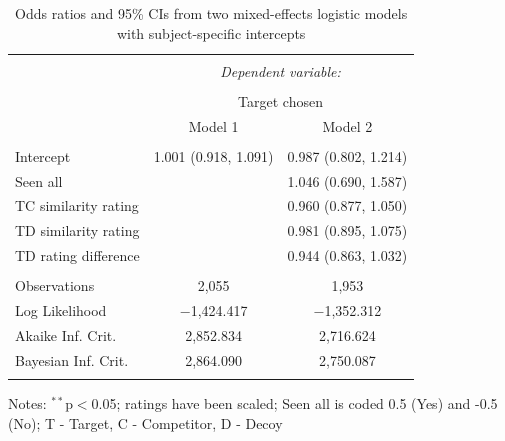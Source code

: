 \documentclass[12pt, a4paper]{article}
\newcommand{\AT}[1] {{\textcolor{cyan}{#1}}}
\newcommand{\TM}[1] {{\textcolor{orange}{#1}}}
\begin{document}
\begin{table}[htb]
\centering
  \begin{threeparttable}
    \captionsetup{justification=centering}
    \caption{Odds ratios and 95\% CIs from two mixed-effects logistic models with subject-specific intercepts}
  \label{latentattr_exp2reg}
\begin{tabular}{@{\extracolsep{5pt}}lcc}
\\[-1.8ex]\hline
\hline \\[-1.8ex]
 & \multicolumn{2}{c}{\textit{Dependent variable:}} \\
\cline{2-3}
\\[-1.8ex] & \multicolumn{2}{c}{Target chosen} \\
 & Model 1 & Model 2 \\
\hline \\[-1.8ex]
 Intercept & 1.001 (0.918, 1.091) & 0.987 (0.802, 1.214) \\
  Seen all &  & 1.046 (0.690, 1.587) \\
  TC similarity rating &  & 0.960 (0.877, 1.050) \\
  TD similarity rating &  & 0.981 (0.895, 1.075) \\
  TD rating difference &  & 0.944 (0.863, 1.032) \\
 \hline \\[-1.8ex]
Observations & 2,055 & 1,953 \\
Log Likelihood & $-$1,424.417 & $-$1,352.312 \\
Akaike Inf. Crit. & 2,852.834 & 2,716.624 \\
Bayesian Inf. Crit. & 2,864.090 & 2,750.087 \\
\hline
\hline \\[-1.8ex]
\end{tabular}
    \begin{tablenotes}
      \small
      \item Notes: $^{**}$p$<$0.05; ratings have been scaled; Seen all is coded 0.5 (Yes) and -0.5 (No); T - Target, C - Competitor, D - Decoy
    \end{tablenotes}
  \end{threeparttable}
\end{table}



\end{document}
